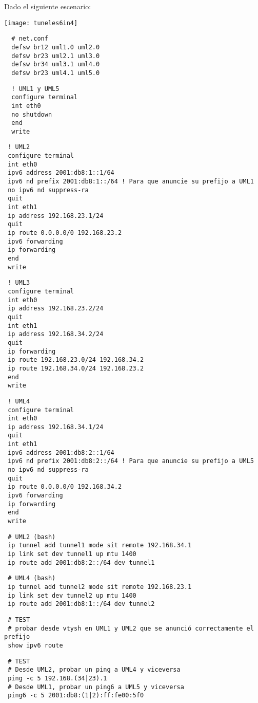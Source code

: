 Dado el siguiente escenario:

\texttt{[image: tuneles6in4]}

\begin{verbatim}
  # net.conf
  defsw br12 uml1.0 uml2.0
  defsw br23 uml2.1 uml3.0
  defsw br34 uml3.1 uml4.0
  defsw br23 uml4.1 uml5.0
\end{verbatim}

\begin{verbatim}
  ! UML1 y UML5
  configure terminal
  int eth0
  no shutdown
  end
  write
\end{verbatim}

\begin{verbatim}
 ! UML2
 configure terminal
 int eth0
 ipv6 address 2001:db8:1::1/64
 ipv6 nd prefix 2001:db8:1::/64 ! Para que anuncie su prefijo a UML1
 no ipv6 nd suppress-ra
 quit
 int eth1
 ip address 192.168.23.1/24
 quit
 ip route 0.0.0.0/0 192.168.23.2
 ipv6 forwarding
 ip forwarding
 end
 write
\end{verbatim}

\begin{verbatim}
 ! UML3
 configure terminal
 int eth0
 ip address 192.168.23.2/24
 quit
 int eth1
 ip address 192.168.34.2/24
 quit
 ip forwarding
 ip route 192.168.23.0/24 192.168.34.2
 ip route 192.168.34.0/24 192.168.23.2
 end
 write
\end{verbatim}

\begin{verbatim}
 ! UML4
 configure terminal
 int eth0
 ip address 192.168.34.1/24
 quit
 int eth1
 ipv6 address 2001:db8:2::1/64
 ipv6 nd prefix 2001:db8:2::/64 ! Para que anuncie su prefijo a UML5
 no ipv6 nd suppress-ra
 quit
 ip route 0.0.0.0/0 192.168.34.2
 ipv6 forwarding
 ip forwarding
 end
 write
\end{verbatim}

\begin{verbatim}
 # UML2 (bash)
 ip tunnel add tunnel1 mode sit remote 192.168.34.1
 ip link set dev tunnel1 up mtu 1400
 ip route add 2001:db8:2::/64 dev tunnel1
\end{verbatim}

\begin{verbatim}
 # UML4 (bash)
 ip tunnel add tunnel2 mode sit remote 192.168.23.1
 ip link set dev tunnel2 up mtu 1400
 ip route add 2001:db8:1::/64 dev tunnel2
\end{verbatim}

\begin{verbatim}
 # TEST
 # probar desde vtysh en UML1 y UML2 que se anunció correctamente el prefijo
 show ipv6 route
\end{verbatim}

\begin{verbatim}
 # TEST
 # Desde UML2, probar un ping a UML4 y viceversa
 ping -c 5 192.168.(34|23).1
 # Desde UML1, probar un ping6 a UML5 y viceversa
 ping6 -c 5 2001:db8:(1|2):ff:fe00:5f0
\end{verbatim}
